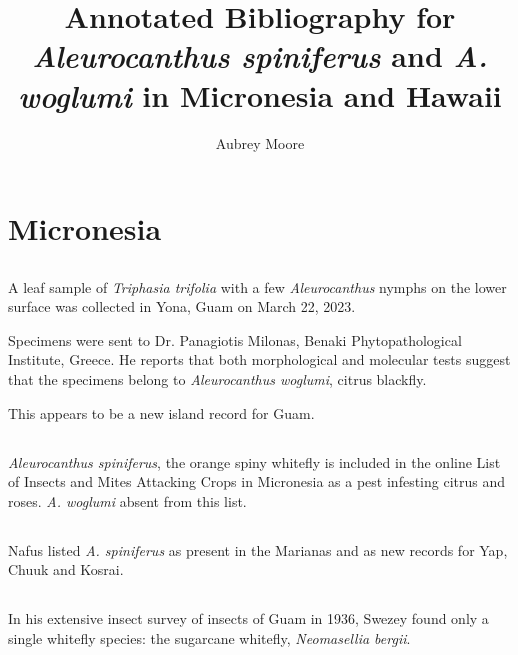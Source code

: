 \documentclass[]{scrartcl}
\title{Annotated Bibliography for \textit{Aleurocanthus spiniferus} and \textit{A. woglumi} in Micronesia and Hawaii}
\author{Aubrey Moore}
\begin{document}
\maketitle

\section{Micronesia}

\subsection{}

A leaf sample of \textit{Triphasia trifolia} with a few \textit{Aleurocanthus} nymphs on the lower surface was collected in Yona, Guam on March 22, 2023.
 
Specimens were sent to Dr. Panagiotis Milonas, Benaki Phytopathological Institute, Greece. He reports that both morphological and molecular tests suggest that the specimens belong to \textit{Aleurocanthus woglumi}, citrus blackfly.

This appears to be a new island record for Guam.

\subsection{}

\textit{Aleurocanthus spiniferus}, the orange spiny whitefly is included in the online List of Insects and Mites Attacking Crops in Micronesia as a pest infesting citrus and roses. \textit{A. woglumi} absent from this list.

\subsection{}
	
Nafus listed \textit{A. spiniferus} as present in the Marianas and as new records for Yap, Chuuk and Kosrai.

\subsection{}


In his extensive insect survey of insects of Guam in 1936, Swezey found only a single whitefly species: the sugarcane whitefly, \textit{Neomasellia bergii}.

\subsection{}
\end{document}
